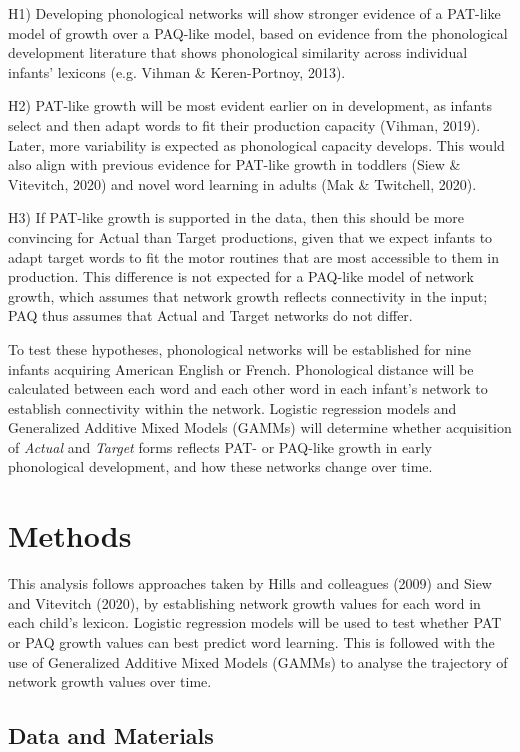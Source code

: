 \documentclass[
  man]{apa6}
\begin{document}
H1) Developing phonological networks will show stronger evidence of a PAT-like model of growth over a PAQ-like model, based on evidence from the phonological development literature that shows phonological similarity across individual infants' lexicons (e.g. Vihman \& Keren-Portnoy, 2013).

H2) PAT-like growth will be most evident earlier on in development, as infants select and then adapt words to fit their production capacity (Vihman, 2019). Later, more variability is expected as phonological capacity develops. This would also align with previous evidence for PAT-like growth in toddlers (Siew \& Vitevitch, 2020) and novel word learning in adults (Mak \& Twitchell, 2020).

H3) If PAT-like growth is supported in the data, then this should be more convincing for Actual than Target productions, given that we expect infants to adapt target words to fit the motor routines that are most accessible to them in production. This difference is not expected for a PAQ-like model of network growth, which assumes that network growth reflects connectivity in the input; PAQ thus assumes that Actual and Target networks do not differ.

To test these hypotheses, phonological networks will be established for nine infants acquiring American English or French. Phonological distance will be calculated between each word and each other word in each infant's network to establish connectivity within the network. Logistic regression models and Generalized Additive Mixed Models (GAMMs) will determine whether acquisition of \emph{Actual} and \emph{Target} forms reflects PAT- or PAQ-like growth in early phonological development, and how these networks change over time.

\hypertarget{methods}{%
\section{Methods}\label{methods}}

This analysis follows approaches taken by Hills and colleagues (2009) and Siew and Vitevitch (2020), by establishing network growth values for each word in each child's lexicon. Logistic regression models will be used to test whether PAT or PAQ growth values can best predict word learning. This is followed with the use of Generalized Additive Mixed Models (GAMMs) to analyse the trajectory of network growth values over time.

\hypertarget{data-and-materials}{%
\subsection{Data and Materials}\label{data-and-materials}}
\end{document}
